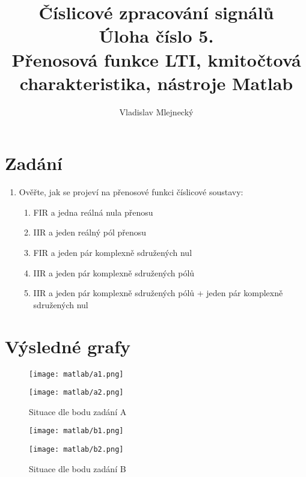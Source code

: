 \documentclass[11pt, a4paper]{article}
\author{Vladislav Mlejnecký}
\title{%
  Číslicové zpracování signálů\\
  \large Úloha číslo 5.\\
  Přenosová funkce LTI, kmitočtová charakteristika, nástroje Matlab}
\begin{document}
    \maketitle
    
    \section{Zadání}
    
    \begin{enumerate} 
        \item
        Ověřte, jak se projeví na přenosové funkci číslicové soustavy:
        \begin{enumerate}[label=(\alph*)]
            \item
            FIR a jedna reálná nula přenosu
            \item
            IIR a jeden reálný pól přenosu
            \item
            FIR a jeden pár komplexně sdružených nul
            \item
            IIR a jeden pár komplexně sdružených pólů
            \item
            IIR a jeden pár komplexně sdružených pólů + jeden pár komplexně sdružených nul
        \end{enumerate}
    \end{enumerate}
    
    \section{Výsledné grafy}
    
        \begin{figure}[H]
            \centering
            \begin{minipage}{.5\textwidth}
                \centering
                \texttt{[image: matlab/a1.png]}
            \end{minipage}%
            \begin{minipage}{.5\textwidth}
                \centering
                \texttt{[image: matlab/a2.png]}
            \end{minipage}
            \caption{Situace dle bodu zadání A}
            \label{fig:1}
        \end{figure}

        \begin{figure}[H]
            \centering
            \begin{minipage}{.5\textwidth}
                \centering
                \texttt{[image: matlab/b1.png]}
            \end{minipage}%
            \begin{minipage}{.5\textwidth}
                \centering
                \texttt{[image: matlab/b2.png]}
            \end{minipage}
            \caption{Situace dle bodu zadání B}
            \label{fig:2}
        \end{figure}
\end{document}
